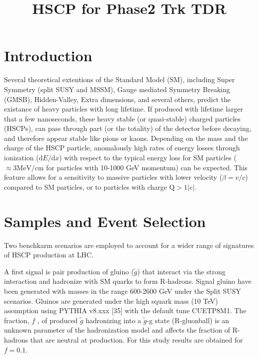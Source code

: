 \documentclass[11pt,twoside,a4paper]{article}
\title{HSCP for Phase2 Trk TDR}
\begin{document}
\section{Introduction}

Several theoretical extentions of the Standard Model (SM), including Super Symmetry (split SUSY and MSSM), Gauge mediated Symmetry Breaking (GMSB), Hidden-Valley, Extra dimensions, and several others, predict the existance of heavy particles with long lifetime.
If produced with lifetime larger that a few nanoseconds, these heavy stable (or quasi-stable) charged particles (HSCPs), can pass through part (or the totality) of the detector before decaying, and therefore appear stable like pions or kaons.
Depending on the mass and the charge of the HSCP particle, anomalously high rates of energy losses through ionization ($\mathrm{d}E/\mathrm{d}x$) with respect to the typical energy loss for SM particles ($\approx 3 \mathrm{MeV}/\mathrm{cm}$ for particles with 10-1000 GeV momentum) can be expected. 
This feature allows for a sensitivity to massive particles with lower velocity ($\beta = v/c$) compared to SM particles, or to particles with charge $\mathrm{Q} > 1|e|$.

\section{Samples and Event Selection}

Two benchkarm scenarios are employed to account for a wider range of signatures of HSCP production at LHC.

A first signal is pair production of gluino ($\tilde{g}$) that interact via the strong interaction and hadronize with SM quarks to form R-hadrons. 
Signal gluino have been generated with masses in the range 600-2600 GeV under the Split SUSY scenarios.
Gluinos are generated under the high squark mass (10 TeV) assumption using PYTHIA v8.xxx [35] with the default tune CUETP8M1.
The fraction, $f$ , of produced $\tilde{g}$ hadronizing into a $\tilde{g}$-g state (R-gluonball) is an unknown parameter of the hadronization model and affects the fraction of R-hadrons that are neutral at production. 
For this study results are obtained for $f = 0.1$.
\end{document}
